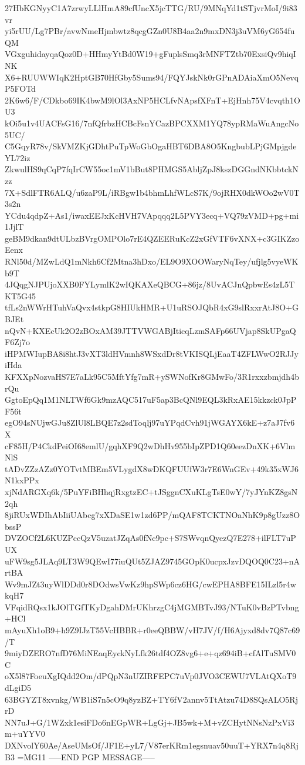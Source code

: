 27HbKGNyyC1A7zrwyLLlHmA89cfUncX5jcTTG/RU/9MNqYd1tSTjvrMoI/9i83vr
yi5rUU/Lg7PBr/avwNmeHjmbwtz8qcgGZn0U8B4aa2n9mxDN3j3uVM6yG654fuQM
VGxguhidayqaQoz0D+HHmyYtBd0W19+gFuplsSmq3rMNFTZtb70ExsiQv9hiqINK
X6+RUUWWIqK2HptGB70HfGby5Sums94/FQYJskNk0rGPnADAiaXmO5NevqP5FOTd
2K6w6/F/CDkbo69IK4bwM9lOl3AxNP5HCLfvNApsfXFnT+EjHnh75V4cvqth1OU3
kOi5u1v4UACFsG16/7nfQfrbzHCBcFsnYCazBPCXXM1YQ78ypRMaWuAngcNo5UC/
C5GqyR78v/SkVMZKjGDhtPuTpWoGbOgaHBT6DBA8O5KngbubLPjGMpjgdeYL72iz
ZkwulHS9qCqP7fqIrCW55oc1mV1bBut8PHMGS5AbljZpJ8kszDGGndNKbbtckNzz
7X+SdlFTR6ALQ/u6zaP9L/iRBgw1b4bhmLhfWLcS7K/9ojRHX0dkWOo2wV0T3s2n
YCdu4qdpZ+As1/iwaxEEJxKcHVH7VApqqq2L5PVY3ecq+VQ79zVMD+pg+mi1JjlT
geBM9dkan9dtULbzBVrgOMPOlo7rE4QZEERuKcZ2xGfVTF6vXNX+c3GIKZzoEenx
RNl50d/MZwLdQ1mNkh6Cf2Mtna3hDxo/EL9O9XOOWaryNqTey/ufjlg5vyeWKb9T
4JQqgNJPUjoXXB0FYLymlK2wIQKAXeQBCG+86jz/8UvACJnQpbwEs4zL5TKT5G45
tfLs2nWWrHTuhVaQvx4stkpG8HIUkHMR+U1uRSOJQbR4xG9slRxxrAtJ8O+GBJEt
nQvN+KXEcUk2O2zBOxAM39JTTVWGABjIticqLzmSAFp66UVjap8SkUPgaQF6Zj7o
iHPMWIupBA8i8htJ3vXT3ldHVmnh8WSxdDr8tVKISQLjEaaT4ZFLWwO2RJJyiHda
KFXXpNozvaHS7E7aLk95C5MftYfg7mR+ySWNofKr8GMwFo/3R1rxxzbmjdh4brQu
GgtoEpQq1M1NLTWf6Gk9mzAQC517uF5ap3BcQNl9EQL3kRxAE15kkzck0JpPF56t
egO94sNUjwGJu8ZlUl8LBQE7z2sdToqlj97uYPqdCvh91jWGAYX6kE+z7aJ7fv6X
cF85H/P4CkdPeiOI68emlU/gqhXF9Q2wDhHv955bIpZPD1Q60eezDnXK+6VlmNlS
tADvZZzAZz0YOTvtMBEm5VLygdX8wDKQFUUfW3r7E6WnGEv+49k35xWJ6N1kxPPx
xjNdARGXq6k/5PuYFiBHhqjRxgtzEC+tJSggnCXuKLgTsE0wY/7yJYnKZ8gsN2qh
8jiRUxWDIhAbIiiUAbcg7xXDaSE1w1zd6PP/mQAF8TCKTNOaNhK9p8gUzz8ObssP
DVZOCf2L6KUZPccQzV5uzatJZqAs0fNc9pc+S7SWvqnQyezQ7E278+ilFLT7uPUX
uFW9sg5JLAq9LT3W9QEwI77iuQUt5ZJAZ9745GOpK0ucpxJzvDQOQ0C23+nArtBA
Wv9mJZt3uyWlDDd0r8DOdwsVwKz9hpSWp6cz6HG/cwEPHA8BFE15ILzl5r4wkqH7
VFqidRQsx1kJOlTGfTKyDgahDMrUKhrzgC4jMGMBTvJ93/NTuK0vBzPTvbng+HCl
mAyuXh1oB9+h9Z9IJzT55VcHBBR+r0eeQBBW/vH7JV/f/H6Ajyxd8dv7Q87c69/T
9miyDZERO7nfD76MiNEaqEyckNyLfk26tdf4OZ8vg6+e+qz694iB+cfAlTuSMV0C
oX5l87FoeuXgIQdd2Om/dPQpN3nUZIRFEPC7uVp0JVO3CEWU7VLAtQXoT9dLgiD5
63BGYZT8xvnkg/WB1iS7n5cO9q8yzBZ+TY6fV2annv5TtAtzu74D8SQsALO5RjrD
NN7uJ+G/1WZxk1esiFDo6nEGpWR+LgGj+JB5wk+M+vZCHytNNsNzPxVi3m+uYYV0
DXNvolY60Ae/AseUMsOf/JF1E+yL7/V87erKRm1egsnuav50uuT+YRX7n4q8RjB3
=MG11
-----END PGP MESSAGE-----
